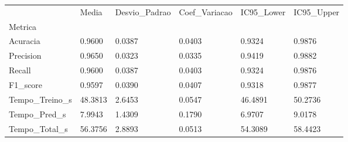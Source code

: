 \begin{tabular}{llllll}
\toprule
 & Media & Desvio_Padrao & Coef_Variacao & IC95_Lower & IC95_Upper \\
Metrica &  &  &  &  &  \\
\midrule
Acuracia & 0.9600 & 0.0387 & 0.0403 & 0.9324 & 0.9876 \\
Precision & 0.9650 & 0.0323 & 0.0335 & 0.9419 & 0.9882 \\
Recall & 0.9600 & 0.0387 & 0.0403 & 0.9324 & 0.9876 \\
F1_score & 0.9597 & 0.0390 & 0.0407 & 0.9318 & 0.9877 \\
Tempo_Treino_s & 48.3813 & 2.6453 & 0.0547 & 46.4891 & 50.2736 \\
Tempo_Pred_s & 7.9943 & 1.4309 & 0.1790 & 6.9707 & 9.0178 \\
Tempo_Total_s & 56.3756 & 2.8893 & 0.0513 & 54.3089 & 58.4423 \\
\bottomrule
\end{tabular}
